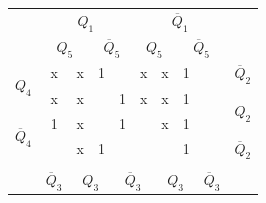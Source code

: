 \documentclass[a4paper,14pt]{article}
\begin{document}
\begin{table}[H]
	\begin{minipage}{.5\linewidth}
		\centering
\begin{tabular}{cccccccccc}
	& \multicolumn{4}{c}{$Q_1$}                                                                         & \multicolumn{4}{c}{$\overline{Q}_1$}                                                             &                        \\
	& \multicolumn{2}{c}{$Q_5$}                       & \multicolumn{2}{c}{$\overline{Q}_5$}            & \multicolumn{2}{c}{$Q_5$}                       & \multicolumn{2}{c}{$\overline{Q}_5$}           &                        \\ \cline{2-9}
	\multicolumn{1}{c|}{\multirow{2}{*}{$Q_4$}}            & \multicolumn{1}{c|}{x} & \multicolumn{1}{c|}{x} & \multicolumn{1}{c|}{1} & \multicolumn{1}{c|}{}  & \multicolumn{1}{c|}{x} & \multicolumn{1}{c|}{x} & \multicolumn{1}{c|}{1} & \multicolumn{1}{c|}{} & $\overline{Q}_2$       \\ \cline{2-9}
	\multicolumn{1}{c|}{}                                  & \multicolumn{1}{c|}{x} & \multicolumn{1}{c|}{x} & \multicolumn{1}{c|}{}  & \multicolumn{1}{c|}{1} & \multicolumn{1}{c|}{x} & \multicolumn{1}{c|}{x} & \multicolumn{1}{c|}{1} & \multicolumn{1}{c|}{} & \multirow{2}{*}{$Q_2$} \\ \cline{2-9}
	\multicolumn{1}{c|}{\multirow{2}{*}{$\overline{Q}_4$}} & \multicolumn{1}{c|}{1} & \multicolumn{1}{c|}{x} & \multicolumn{1}{c|}{}  & \multicolumn{1}{c|}{1} & \multicolumn{1}{c|}{}  & \multicolumn{1}{c|}{x} & \multicolumn{1}{c|}{1} & \multicolumn{1}{c|}{} &                        \\ \cline{2-9}
	\multicolumn{1}{c|}{}                                  & \multicolumn{1}{c|}{}  & \multicolumn{1}{c|}{x} & \multicolumn{1}{c|}{1} & \multicolumn{1}{c|}{}  & \multicolumn{1}{c|}{}  & \multicolumn{1}{c|}{}  & \multicolumn{1}{c|}{1} & \multicolumn{1}{c|}{} & $\overline{Q}_2$       \\ \cline{2-9}
	&                        & \multicolumn{2}{c}{}                            & \multicolumn{2}{c}{}                            & \multicolumn{2}{c}{}                            &                       &                        \\
	& $\overline{Q}_3$       & \multicolumn{2}{c}{$Q_3$}                       & \multicolumn{2}{c}{$\overline{Q}_3$}            & \multicolumn{2}{c}{$Q_3$}                       & $\overline{Q}_3$      &                       

\end{tabular}
\end{minipage}
\end{table}
\end{document}
